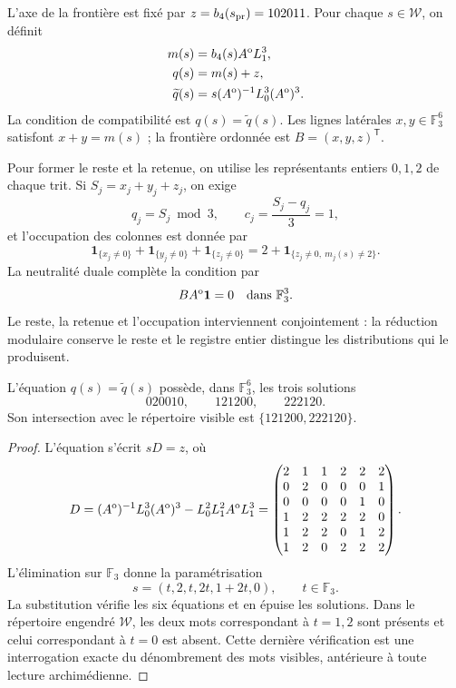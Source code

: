 L’axe de la frontière est fixé par $z=b_4(s_{\rm pr})=102011$. Pour chaque $s\in\mathcal W$, on définit
\begin{align}
m(s)&=b_4(s)A^{\rm o}L_1^3,\\
q(s)&=m(s)+z,\\
\widetilde q(s)&=s(A^{\rm o})^{-1}L_0^3(A^{\rm o})^3.
\label{r36c:eq:compat-datos}
\end{align}
La condition de compatibilité est $q(s)=\widetilde q(s)$. Les lignes latérales $x,y\in\mathbb F_3^6$ satisfont $x+y=m(s)$ ; la frontière ordonnée est $B=(x,y,z)^{\mathsf T}$.

Pour former le reste et la retenue, on utilise les représentants entiers $0,1,2$ de chaque trit. Si $S_j=x_j+y_j+z_j$, on exige
\[
q_j=S_j\bmod3,\qquad c_j=\frac{S_j-q_j}{3}=1,
\]
et l’occupation des colonnes est donnée par
\begin{equation}
\mathbf1_{\{x_j\ne0\}}+\mathbf1_{\{y_j\ne0\}}+\mathbf1_{\{z_j\ne0\}}
=2+\mathbf1_{\{z_j\ne0,\ m_j(s)\ne2\}}.
\label{r36c:eq:ocupacion}
\end{equation}
La neutralité duale complète la condition par
\begin{equation}
BA^{\rm o}\mathbf1=0\quad\hbox{dans }\mathbb F_3^3.
\label{r36c:eq:neutralidad}
\end{equation}
Le reste, la retenue et l’occupation interviennent conjointement : la réduction modulaire conserve le reste et le registre entier distingue les distributions qui le produisent.

\begin{lemma}
\label{r36c:lem:compatibilidad} L’équation $q(s)=\widetilde q(s)$ possède, dans $\mathbb F_3^6$, les trois solutions
\[
020010,\qquad121200,\qquad222120.
\]
Son intersection avec le répertoire visible est $\{121200,222120\}$.
\end{lemma}
\begin{proof}
L’équation s’écrit $sD=z$, où
\[
D=(A^{\rm o})^{-1}L_0^3(A^{\rm o})^3
   -L_0^2L_1^2A^{\rm o}L_1^3
 =\begin{pmatrix}
2&1&1&2&2&2\\0&2&0&0&0&1\\0&0&0&0&1&0\\
1&2&2&2&2&0\\1&2&2&0&1&2\\1&2&0&2&2&2
\end{pmatrix}.
\]
L’élimination sur $\mathbb F_3$ donne la paramétrisation
\[
s=(t,2,t,2t,1+2t,0),\qquad t\in\mathbb F_3.
\]
La substitution vérifie les six équations et en épuise les solutions. Dans le répertoire engendré $\mathcal W$, les deux mots correspondant à $t=1,2$ sont présents et celui correspondant à $t=0$ est absent. Cette dernière vérification est une interrogation exacte du dénombrement des mots visibles, antérieure à toute lecture archimédienne.
\end{proof}

